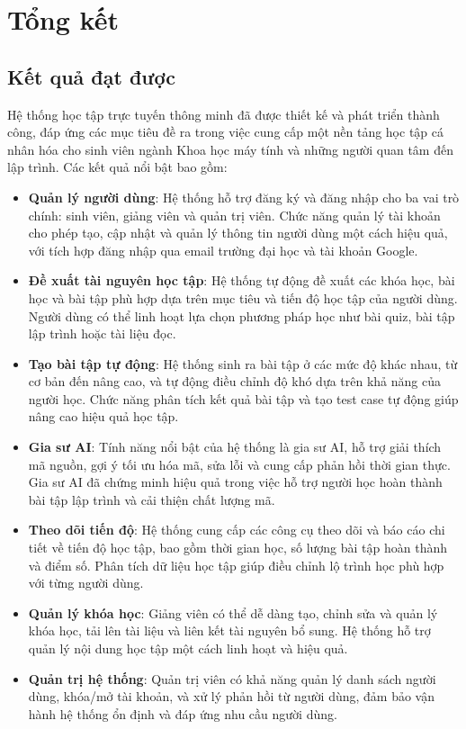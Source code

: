 \chapter{Tổng kết}

\section{Kết quả đạt được}

Hệ thống học tập trực tuyến thông minh đã được thiết kế và phát triển thành công, đáp ứng các mục tiêu đề ra trong việc cung cấp một nền tảng học tập cá nhân hóa cho sinh viên ngành Khoa học máy tính và những người quan tâm đến lập trình. Các kết quả nổi bật bao gồm:

\begin{itemize}
	\item \textbf{Quản lý người dùng}: Hệ thống hỗ trợ đăng ký và đăng nhập cho ba vai trò chính: sinh viên, giảng viên và quản trị viên. Chức năng quản lý tài khoản cho phép tạo, cập nhật và quản lý thông tin người dùng một cách hiệu quả, với tích hợp đăng nhập qua email trường đại học và tài khoản Google.
	\item \textbf{Đề xuất tài nguyên học tập}: Hệ thống tự động đề xuất các khóa học, bài học và bài tập phù hợp dựa trên mục tiêu và tiến độ học tập của người dùng. Người dùng có thể linh hoạt lựa chọn phương pháp học như bài quiz, bài tập lập trình hoặc tài liệu đọc.
	\item \textbf{Tạo bài tập tự động}: Hệ thống sinh ra bài tập ở các mức độ khác nhau, từ cơ bản đến nâng cao, và tự động điều chỉnh độ khó dựa trên khả năng của người học. Chức năng phân tích kết quả bài tập và tạo test case tự động giúp nâng cao hiệu quả học tập.
	\item \textbf{Gia sư AI}: Tính năng nổi bật của hệ thống là gia sư AI, hỗ trợ giải thích mã nguồn, gợi ý tối ưu hóa mã, sửa lỗi và cung cấp phản hồi thời gian thực. Gia sư AI đã chứng minh hiệu quả trong việc hỗ trợ người học hoàn thành bài tập lập trình và cải thiện chất lượng mã.
	\item \textbf{Theo dõi tiến độ}: Hệ thống cung cấp các công cụ theo dõi và báo cáo chi tiết về tiến độ học tập, bao gồm thời gian học, số lượng bài tập hoàn thành và điểm số. Phân tích dữ liệu học tập giúp điều chỉnh lộ trình học phù hợp với từng người dùng.
	\item \textbf{Quản lý khóa học}: Giảng viên có thể dễ dàng tạo, chỉnh sửa và quản lý khóa học, tải lên tài liệu và liên kết tài nguyên bổ sung. Hệ thống hỗ trợ quản lý nội dung học tập một cách linh hoạt và hiệu quả.
	\item \textbf{Quản trị hệ thống}: Quản trị viên có khả năng quản lý danh sách người dùng, khóa/mở tài khoản, và xử lý phản hồi từ người dùng, đảm bảo vận hành hệ thống ổn định và đáp ứng nhu cầu người dùng.
\end{itemize}

